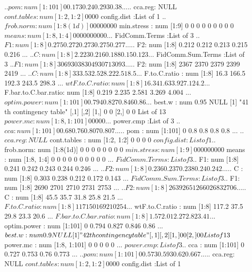 \documentclass[11pt]{article} %
\begin{document}
\begin{Schunk}
\begin{Soutput}
  ..$ pom    : num [1:101] 0 0.173 0.24 0.293 0.38 ...
  ..$ cca.reg: NULL
 $ cont.tables         : num [1:2, 1:2] 0 0 0 0
 $ config.dist         :List of 1
  ..$ frob.norm: num [1:8(1d)] 0 0 0 0 0 0 0 0
 $ min.stress          : num [1:9] 0 0 0 0 0 0 0 0 0
 $ means               : num [1:8, 1:4] 0 0 0 0 0 0 0 0 0 0 ...
 $ FidComm.Terms       :List of 3
  ..$ F1: num [1:8] 0.275 0.272 0.273 0.275 0.277 ...
  ..$ F2: num [1:8] 0.212 0.212 0.213 0.215 0.216 ...
  ..$ C : num [1:8] 2.223 0.216 0.188 0.15 0.123 ...
 $ FidComm.Sum.Terms   :List of 3
  ..$ F1: num [1:8] 3069 3038 3049 3071 3093 ...
  ..$ F2: num [1:8] 2367 2370 2379 2399 2419 ...
  ..$ C : num [1:8] 333.5 32.5 28.2 22.5 18.5 ...
 $ F.to.C.ratio        : num [1:8] 16.3 166.5 192.3 243.5 298.3 ...
 $ wtF.to.C.ratio      : num [1:8] 16.3 41.6 33.9 27.1 24.2 ...
 $ F.bar.to.C.bar.ratio: num [1:8] 0.219 2.235 2.581 3.269 4.004 ...
 $ optim.power         : num [1:101] 0 0.794 0.827 0.846 0.86 ...
 $ best.w              : num 0.95
NULL
[1] "41 th contingency table"
     [,1] [,2]
[1,]    0    0
[2,]    0    0
List of 13
 $ power.mc            : num [1:8, 1:101] 0 0 0 0 0 ...
 $ power.cmp           :List of 3
  ..$ cca    : num [1:101] 0 0.68 0.76 0.807 0.807 ...
  ..$ pom    : num [1:101] 0 0.8 0.8 0.8 0.8 ...
  ..$ cca.reg: NULL
 $ cont.tables         : num [1:2, 1:2] 0 0 0 0
 $ config.dist         :List of 1
  ..$ frob.norm: num [1:8(1d)] 0 0 0 0 0 0 0 0
 $ min.stress          : num [1:9] 0 0 0 0 0 0 0 0 0
 $ means               : num [1:8, 1:4] 0 0 0 0 0 0 0 0 0 0 ...
 $ FidComm.Terms       :List of 3
  ..$ F1: num [1:8] 0.241 0.242 0.243 0.244 0.246 ...
  ..$ F2: num [1:8] 0.236 0.237 0.238 0.24 0.242 ...
  ..$ C : num [1:8] 0.303 0.238 0.212 0.172 0.143 ...
 $ FidComm.Sum.Terms   :List of 3
  ..$ F1: num [1:8] 2690 2701 2710 2731 2753 ...
  ..$ F2: num [1:8] 2639 2651 2660 2683 2706 ...
  ..$ C : num [1:8] 45.5 35.7 31.8 25.8 21.5 ...
 $ F.to.C.ratio        : num [1:8] 117 150 169 210 254 ...
 $ wtF.to.C.ratio      : num [1:8] 117.2 37.5 29.8 23.3 20.6 ...
 $ F.bar.to.C.bar.ratio: num [1:8] 1.57 2.01 2.27 2.82 3.41 ...
 $ optim.power         : num [1:101] 0 0.794 0.827 0.846 0.86 ...
 $ best.w              : num 0.9
NULL
[1] "42 th contingency table"
     [,1] [,2]
[1,]    0    0
[2,]    0    0
List of 13
 $ power.mc            : num [1:8, 1:101] 0 0 0 0 0 ...
 $ power.cmp           :List of 3
  ..$ cca    : num [1:101] 0 0.727 0.753 0.76 0.773 ...
  ..$ pom    : num [1:101] 0 0.573 0.593 0.62 0.667 ...
  ..$ cca.reg: NULL
 $ cont.tables         : num [1:2, 1:2] 0 0 0 0
 $ config.dist         :List of 1

\end{Soutput}
\end{Schunk}
\end{document}
